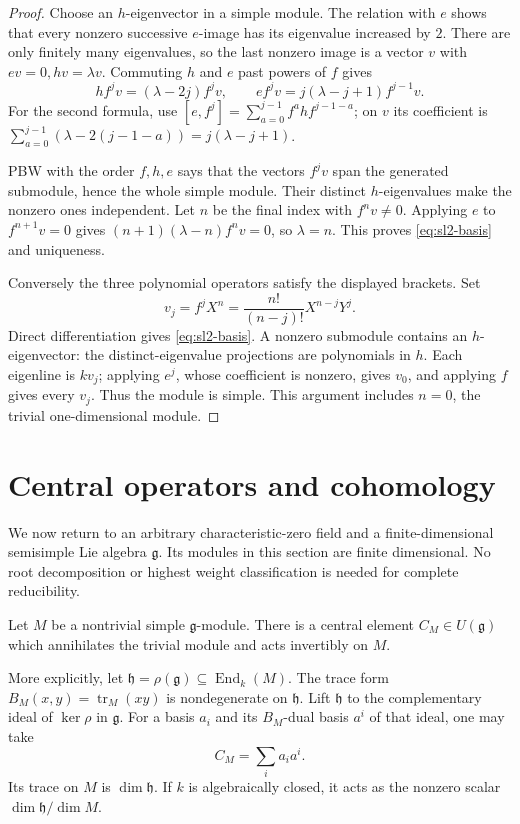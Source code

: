 \begin{proof}
Choose an \(h\)-eigenvector in a simple module. The
relation with \(e\) shows that every nonzero successive
\(e\)-image has its eigenvalue increased by \(2\).
There are only finitely many eigenvalues, so the last
nonzero image is a vector \(v\) with
\(ev=0,hv=\lambda v\).
Commuting \(h\) and \(e\) past powers of \(f\) gives
\[
 hf^jv=(\lambda-2j)f^jv,\qquad
 ef^jv=j(\lambda-j+1)f^{j-1}v.
 \tag{3.2}\label{eq:sl2-ladder}
\]
For the second formula, use
\([e,f^j]=\sum_{a=0}^{j-1}f^a h f^{j-1-a}\);
on \(v\) its coefficient is
\(\sum_{a=0}^{j-1}(\lambda-2(j-1-a))
=j(\lambda-j+1)\).

PBW with the order \(f,h,e\) says that the vectors
\(f^jv\) span the generated submodule, hence the whole
simple module. Their distinct \(h\)-eigenvalues make
the nonzero ones independent. Let \(n\) be the final
index with \(f^nv\ne0\). Applying \(e\) to
\(f^{n+1}v=0\) gives
\((n+1)(\lambda-n)f^nv=0\), so \(\lambda=n\).
This proves \eqref{eq:sl2-basis} and uniqueness.

Conversely the three polynomial operators satisfy
the displayed brackets. Set
\[
 v_j=f^jX^n=\frac{n!}{(n-j)!}X^{n-j}Y^j.
\]
Direct differentiation gives
\eqref{eq:sl2-basis}. A nonzero submodule contains an
\(h\)-eigenvector: the distinct-eigenvalue projections
are polynomials in \(h\). Each eigenline is \(kv_j\);
applying \(e^j\), whose coefficient is nonzero,
gives \(v_0\), and applying \(f\) gives every \(v_j\).
Thus the module is simple. This argument includes
\(n=0\), the trivial one-dimensional module.
\end{proof}

\section{Central operators and cohomology}

We now return to an arbitrary characteristic-zero field
and a finite-dimensional semisimple Lie algebra
\(\mathfrak g\). Its modules in this section are
finite dimensional. No root decomposition or highest
weight classification is needed for complete
reducibility.

\begin{theorem}\label{res:C02}
Let \(M\) be a nontrivial simple \(\mathfrak g\)-module.
There is a central element \(C_M\in U(\mathfrak g)\)
which annihilates the trivial module and acts
invertibly on \(M\).

More explicitly, let
\(\mathfrak h=\rho(\mathfrak g)\subseteq\operatorname{End}_k(M)\).
The trace form
\(B_M(x,y)=\operatorname{tr}_M(xy)\) is nondegenerate
on \(\mathfrak h\). Lift \(\mathfrak h\) to the
complementary ideal of \(\ker\rho\) in \(\mathfrak g\).
For a basis \(a_i\) and its \(B_M\)-dual basis \(a^i\)
of that ideal, one may take
\[
 C_M=\sum_i a_i a^i.
 \tag{3.3}\label{eq:module-casimir}
\]
Its trace on \(M\) is \(\dim\mathfrak h\).
If \(k\) is algebraically closed, it acts as the
nonzero scalar \(\dim\mathfrak h/\dim M\).
\end{theorem}

